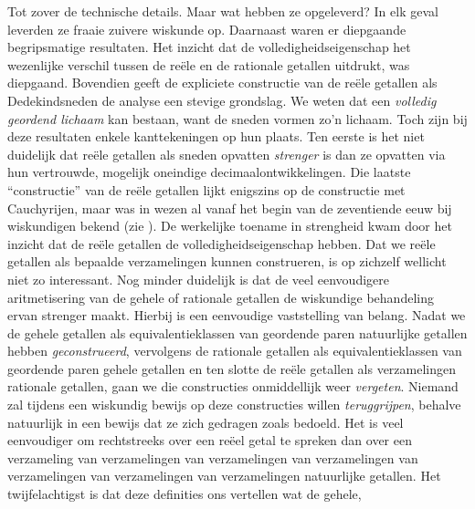 \documentclass[openany]{memoir}
\begin{document}
Tot zover de technische details. Maar wat hebben ze opgeleverd?
In elk geval leverden ze {fraaie} zuivere wiskunde op. Daarnaast waren
er diepgaande begripsmatige resultaten. Het inzicht dat de
volledigheidseigenschap het wezenlijke verschil tussen de reële en de
rationale getallen uitdrukt, was diepgaand. Bovendien geeft de
expliciete constructie van de reële getallen als Dedekindsneden de
analyse een stevige grondslag. We weten dat een \emph{volledig
geordend lichaam} kan bestaan, want de sneden vormen zo'n lichaam.
Toch zijn bij deze resultaten enkele kanttekeningen op hun plaats.
Ten eerste is het niet duidelijk dat reële getallen als sneden
opvatten \emph{strenger} is dan ze opvatten via hun vertrouwde,
mogelijk oneindige decimaalontwikkelingen. Die laatste ``constructie''
van de reële getallen lijkt enigszins op de constructie met
Cauchyrijen, maar was in wezen al vanaf het begin van de zeventiende
eeuw bij wiskundigen bekend (zie ). De werkelijke
toename in strengheid kwam door het inzicht dat de reële getallen de
volledigheidseigenschap hebben. Dat we reële getallen als bepaalde
verzamelingen kunnen construeren, is op zichzelf wellicht niet zo
interessant.
Nog minder duidelijk is dat de veel eenvoudigere aritmetisering van de
gehele of rationale getallen de wiskundige behandeling ervan strenger maakt.
Hierbij is een eenvoudige vaststelling van belang. Nadat we de gehele
getallen als equivalentieklassen van geordende paren natuurlijke
getallen hebben \emph{geconstrueerd}, vervolgens de rationale getallen
als equivalentieklassen van geordende paren gehele getallen en ten
slotte de reële getallen als verzamelingen rationale getallen, gaan we
die constructies onmiddellijk weer \emph{vergeten}. Niemand zal tijdens
een wiskundig bewijs op deze constructies willen \emph{teruggrijpen},
behalve natuurlijk in een bewijs dat ze zich gedragen zoals bedoeld.
Het is veel eenvoudiger om rechtstreeks over een reëel getal te
spreken dan over een verzameling van verzamelingen van verzamelingen
van verzamelingen van verzamelingen van verzamelingen van verzamelingen
natuurlijke getallen.
%
%
%
Het twijfelachtigst is dat deze definities ons vertellen wat de gehele,
\end{document}
